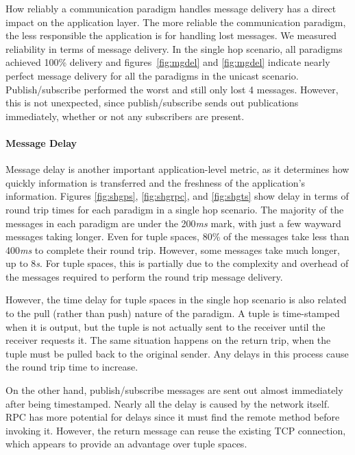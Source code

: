 How reliably a communication paradigm handles message delivery has a direct impact on the application layer. The more reliable the communication paradigm, the less responsible the application is for handling lost messages. We measured reliability in terms of message delivery. In the single hop scenario, all paradigms achieved 100\% delivery and figures~\ref{fig:mgdel} and \ref{fig:mgdel} indicate nearly perfect message delivery for all the paradigms in the unicast scenario. Publish/subscribe performed the worst and still only lost 4 messages. However, this is not unexpected, since publish/subscribe sends out publications immediately, whether or not any subscribers are present.

\paragraph{Message Delay}

Message delay is another important application-level metric, as it determines how quickly information is transferred and the freshness of the application's information. Figures \ref{fig:shgps}, \ref{fig:shgrpc}, and \ref{fig:shgts} show delay in terms of round trip times for each paradigm in a single hop scenario. The majority of the messages in each paradigm are under the 200\textit{ms} mark, with just a few wayward messages taking longer. Even for tuple spaces, 80\% of the messages take less than 400\textit{ms} to complete their round trip. However, some messages take much longer, up to 8\textit{s}. For tuple spaces, this is partially due to the complexity and overhead of the messages required to perform the round trip message delivery.

However, the time delay for tuple spaces in the single hop scenario is also related to the pull (rather than push) nature of the paradigm. A tuple is time-stamped when it is output, but the tuple is not actually sent to the receiver until the receiver requests it. The same situation happens on the return trip, when the tuple must be pulled back to the original sender. Any delays in this process cause the round trip time to increase.

On the other hand, publish/subscribe messages are sent out almost immediately after being timestamped. Nearly all the delay is caused by the network itself. RPC has more potential for delays since it must find the remote method before invoking it. However, the return message can reuse the existing TCP connection, which appears to provide an advantage over tuple spaces.

